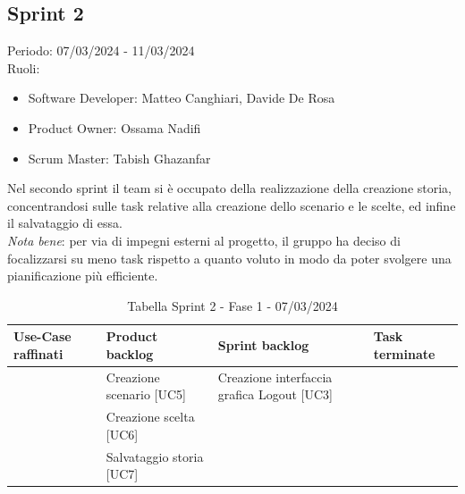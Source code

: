\documentclass{article}
\begin{document}
\clearpage
\subsection*{Sprint 2}
Periodo: 07/03/2024 - 11/03/2024\vspace*{7pt}\\
Ruoli:
\begin{itemize}[label = { }]
    \itemsep0em
    \item Software Developer: Matteo Canghiari, Davide De Rosa
    \item Product Owner: Ossama Nadifi 
    \item Scrum Master: Tabish Ghazanfar
\end{itemize}
Nel secondo sprint il team si è occupato della realizzazione della creazione storia, concentrandosi sulle task relative alla creazione dello scenario e le scelte, ed infine il salvataggio di essa.\vspace*{7pt}\\
\textit{Nota bene}: per via di impegni esterni al progetto, il gruppo ha deciso di focalizzarsi su meno task rispetto a quanto voluto in modo da poter svolgere una pianificazione più efficiente.

\begin{table}[h]
    \centering
    \begin{tabularx}{\textwidth}{|X|X|X|X|}
        \hline
        \bf Use-Case raffinati & \bf Product backlog & \bf Sprint backlog & \bf Task terminate \\
        \hline
        & Creazione scenario [UC5] & Creazione interfaccia grafica Logout [UC3] & \\
        \hline
        & Creazione scelta [UC6] & & \\
        \hline
        & Salvataggio storia [UC7] & & \\
        \hline
    \end{tabularx}
    \caption*{Tabella Sprint 2 - Fase 1 - 07/03/2024}
\end{table}
\end{document}
